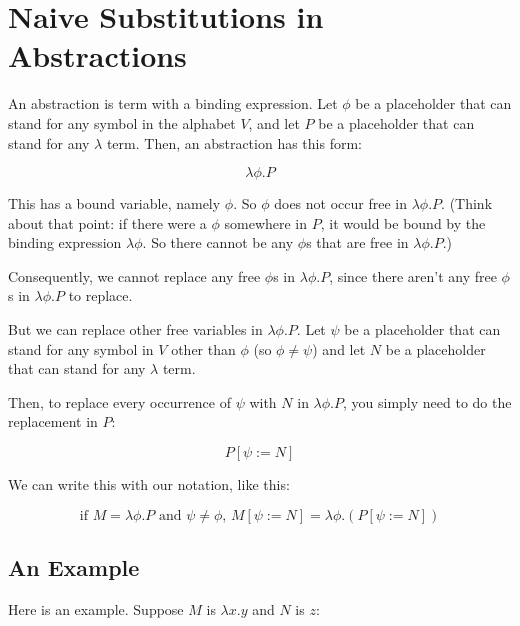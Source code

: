 \documentclass{book}
\numberwithin{equation}{chapter}
\begin{document}
\chapter{Naive Substitutions in Abstractions}

An abstraction is term with a binding expression. Let $\phi$ be a placeholder that can stand for any symbol in the alphabet $V$, and let $P$ be a placeholder that can stand for any $\lambda$ term. Then, an abstraction has this form:

\begin{equation}
\lambda \phi.P
\end{equation}

\noindent
This has a bound variable, namely $\phi$. So $\phi$ does not occur free in $\lambda \phi.P$. (Think about that point: if there were a $\phi$ somewhere in $P$, it would be bound by the binding expression $\lambda \phi$. So there cannot be any $\phi$s that are free in $\lambda \phi.P$.) 

Consequently, we cannot replace any free $\phi$s in $\lambda \phi.P$, since there aren't any free $\phi$s in $\lambda \phi.P$ to replace.

But we can replace other free variables in $\lambda \phi.P$. Let $\psi$ be a placeholder that can stand for any symbol in $V$ other than $\phi$ (so $\phi \not = \psi$) and let $N$ be a placeholder that can stand for any $\lambda$ term.

Then, to replace every occurrence of $\psi$ with $N$ in $\lambda \phi.P$, you simply need to do the replacement in $P$:

\begin{equation}
P[\psi := N]
\end{equation}

\noindent
We can write this with our notation, like this:

\begin{equation}
\text{if $M = \lambda \phi.P$ and $\psi \not = \phi$, $M[\psi := N] = \lambda \phi.(P[\psi := N])$}
\end{equation}


\section{An Example}

Here is an example. Suppose $M$ is $\lambda x.y$ and $N$ is $z$:
\end{document}
